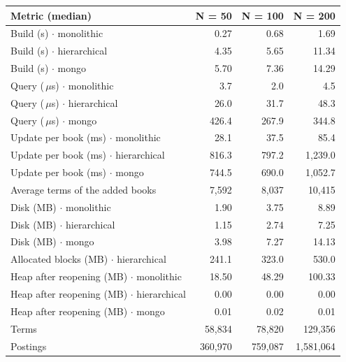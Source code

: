 \documentclass[11pt,a4paper]{article}
\newcommand{\us}{\,$\mu$s}
\begin{document}
\begin{table}[H]
\centering\small
\begin{tabular}{@{}lrrr@{}}
\toprule
Metric (median) & N = 50 & N = 100 & N = 200 \\
\midrule
Build (s) $\cdot$ monolithic & 0.27 & 0.68 & 1.69 \\
Build (s) $\cdot$ hierarchical & 4.35 & 5.65 & 11.34 \\
Build (s) $\cdot$ mongo & 5.70 & 7.36 & 14.29 \\
\midrule
Query (\us) $\cdot$ monolithic & 3.7 & 2.0 & 4.5 \\
Query (\us) $\cdot$ hierarchical & 26.0 & 31.7 & 48.3 \\
Query (\us) $\cdot$ mongo & 426.4 & 267.9 & 344.8 \\
\midrule
Update per book (ms) $\cdot$ monolithic & 28.1 & 37.5 & 85.4 \\
Update per book (ms) $\cdot$ hierarchical & 816.3 & 797.2 & 1,239.0 \\
Update per book (ms) $\cdot$ mongo & 744.5 & 690.0 & 1,052.7 \\
Average terms of the added books & 7,592 & 8,037 & 10,415 \\
\midrule
Disk (MB) $\cdot$ monolithic & 1.90 & 3.75 & 8.89 \\
Disk (MB) $\cdot$ hierarchical & 1.15 & 2.74 & 7.25 \\
Disk (MB) $\cdot$ mongo & 3.98 & 7.27 & 14.13 \\
Allocated blocks (MB) $\cdot$ hierarchical & 241.1 & 323.0 & 530.0 \\
Heap after reopening (MB) $\cdot$ monolithic & 18.50 & 48.29 & 100.33 \\
Heap after reopening (MB) $\cdot$ hierarchical & 0.00 & 0.00 & 0.00 \\
Heap after reopening (MB) $\cdot$ mongo & 0.01 & 0.02 & 0.01 \\
\midrule
Terms & 58,834 & 78,820 & 129,356 \\
Postings & 360,970 & 759,087 & 1,581,064 \\
\bottomrule
\end{tabular}
\end{table}
\end{document}
